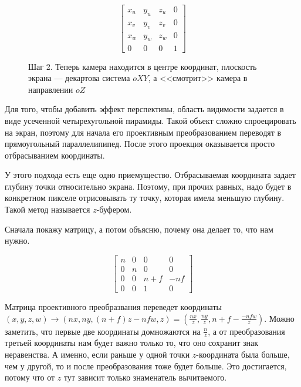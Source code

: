 \documentclass{article}
\begin{document}
$$
\begin{bmatrix}
x_u & y_u & z_u & 0 \\
x_v & y_v & z_v & 0 \\
x_w & y_w & z_w & 0 \\
0 & 0 & 0 & 1
\end{bmatrix}
$$

\begin{center}
\begin{figure}[H]
\caption{Шаг 2. Теперь камера находится в центре координат, плоскость экрана --- декартова система $oXY$, а <<смотрит>> камера в направлении $oZ$}
\label{ris:image}
\end{figure}
\end{center}


Для того, чтобы добавить эффект перспективы, область видимости задается в виде усеченной четырехугольной пирамиды. Такой объект сложно спроецировать на экран, поэтому для начала его проективным преобразованием переводят в прямоугольный параллелипипед. После этого проекция оказывается просто отбрасыванием координаты.

У этого подхода есть еще одно приемущество. Отбрасываемая координата задает глубину точки относительно экрана. Поэтому, при прочих равных, надо будет в конкретном пикселе отрисовывать ту точку, которая имела меньшую глубину. Такой метод называется $z$-буфером.

Сначала покажу матрицу, а потом объясню, почему она делает то, что нам  нужно.

$$
\begin{bmatrix}
n & 0 & 0 & 0 \\
0 & n & 0 & 0 \\
0 & 0 & n + f & -nf \\
0 & 0 & 1 & 0
\end{bmatrix}
$$

Матрица проективного преобразвания переведет координаты $(x, y, z, w) \to (nx, ny, (n + f)z - nfw, z) = (\frac{nx}{z}, \frac{ny}{z}, n + f - \frac{- nfw}{z})$. Можно заметить, что первые две координаты домножаются на $\frac{n}{z}$, а от преобразования третьей координаты нам будет важно только то, что оно сохранит знак неравенства. А именно, если раньше у одной точки $z$-координата была больше, чем у другой, то и после преобразования тоже будет больше. Это достигается, потому что от $z$ тут зависит только знаменатель вычитаемого.
\end{document}
